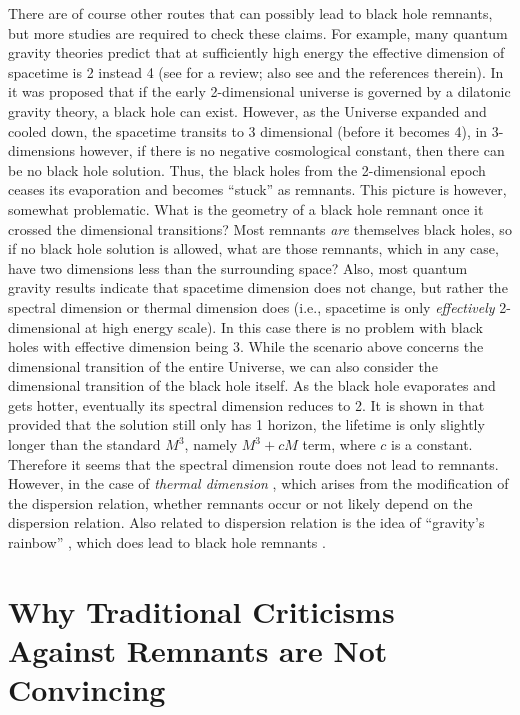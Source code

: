 \documentclass[12pt,preprintnumbers, floatfix, preprintnumbers, letterpaper, superscriptaddress,nofootinbib]{revtex4-2}
\begin{document}
There are of course other routes that can possibly lead to black hole remnants, but more studies are required to check these claims. For example, many quantum gravity theories predict that at sufficiently high energy the effective dimension of spacetime is 2 instead 4 (see \cite{1705.05417} for a review; also see \cite{2111.05018} and the references therein). In \cite{1204.3619} it was proposed that if the early 2-dimensional universe is governed by a dilatonic gravity theory, a black hole can exist. However, as the Universe expanded and cooled down, the spacetime transits to 3 dimensional (before it becomes 4), in 3-dimensions however, if there is no negative cosmological constant, then there can be no black hole solution. Thus, the black holes from the 2-dimensional epoch ceases its evaporation and becomes ``stuck'' as remnants. This picture is however, somewhat problematic. What is the geometry of a black hole remnant once it crossed the dimensional transitions? Most remnants \emph{are} themselves black holes, so if no black hole solution is allowed, what are those remnants, which in any case, have two dimensions less than the surrounding space? Also, most quantum gravity results indicate that spacetime dimension does not change, but rather the spectral dimension or thermal dimension does (i.e., spacetime is only \emph{effectively} 2-dimensional at high energy scale). In this case there is no problem with black holes with effective dimension being 3. While the scenario above concerns the dimensional transition of the entire Universe, we can also consider the dimensional transition of the black hole itself. As the black hole evaporates and gets hotter, eventually its spectral dimension reduces to 2. It is shown in \cite{2111.05018} that provided that the solution still only has 1 horizon, the lifetime is only slightly longer than the standard $M^3$, namely $M^3 + cM$ term, where $c$ is a constant. Therefore it seems that the spectral dimension route does not lead to remnants. However, in the case of \emph{thermal dimension} \cite{1602.08020,2009.08556}, which arises from the modification of the dispersion relation, whether remnants occur or not likely depend on the dispersion relation. Also related to dispersion relation is the idea of ``gravity's rainbow'' \cite{0305055}, which does lead to black hole remnants \cite{1410.5706}. 

\section{Why Traditional Criticisms Against Remnants are Not Convincing}
\end{document}
